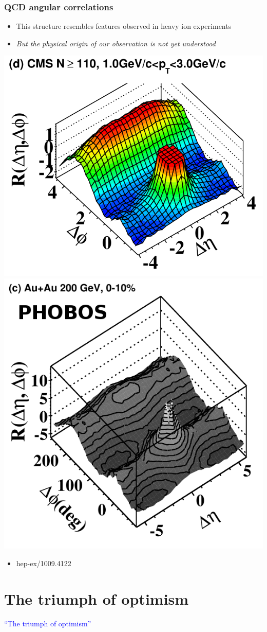 \documentclass[compress]{beamer}
\begin{document}
\begin{frame}
\frametitle{QCD angular correlations}
\begin{itemize}
\item This structure resembles features observed in heavy ion experiments
\item \it But the physical origin of our observation is not yet understood
\end{itemize}

\vspace{-0.3 cm}
\begin{center}
\includegraphics[height=5 cm]{angularcorrelations_big.png}
\includegraphics[height=5 cm]{angularcorrelations_phobos.png}
\end{center}

\vspace{-0.3 cm}
\begin{itemize}
\item hep-ex/1009.4122
\end{itemize}
\end{frame}

\section*{The triumph of optimism}
\begin{frame}
\begin{center}
\Huge \textcolor{blue}{``The triumph of optimism''}
\end{center}
\end{frame}
\end{document}
